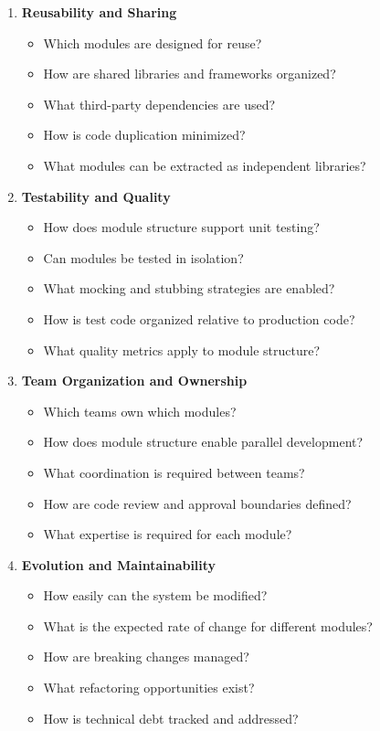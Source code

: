 \documentclass[11pt,letterpaper]{article}
\begin{document}
\begin{enumerate}[label=\textbf{C\arabic*:}, leftmargin=2.5em]
    \item \textbf{Reusability and Sharing}
    \begin{itemize}[nosep]
        \item Which modules are designed for reuse?
        \item How are shared libraries and frameworks organized?
        \item What third-party dependencies are used?
        \item How is code duplication minimized?
        \item What modules can be extracted as independent libraries?
    \end{itemize}
    
    \item \textbf{Testability and Quality}
    \begin{itemize}[nosep]
        \item How does module structure support unit testing?
        \item Can modules be tested in isolation?
        \item What mocking and stubbing strategies are enabled?
        \item How is test code organized relative to production code?
        \item What quality metrics apply to module structure?
    \end{itemize}
    
    \item \textbf{Team Organization and Ownership}
    \begin{itemize}[nosep]
        \item Which teams own which modules?
        \item How does module structure enable parallel development?
        \item What coordination is required between teams?
        \item How are code review and approval boundaries defined?
        \item What expertise is required for each module?
    \end{itemize}
    
    \item \textbf{Evolution and Maintainability}
    \begin{itemize}[nosep]
        \item How easily can the system be modified?
        \item What is the expected rate of change for different modules?
        \item How are breaking changes managed?
        \item What refactoring opportunities exist?
        \item How is technical debt tracked and addressed?
    \end{itemize}
    

\end{enumerate}
\end{document}

